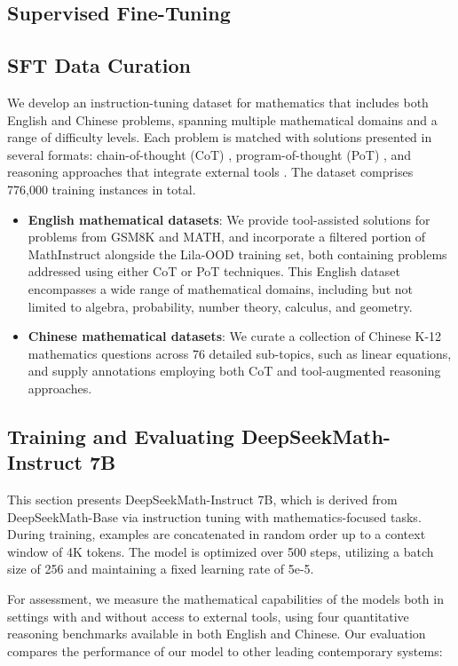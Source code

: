 \begin{itemize}[topsep=0pt]
\section{Supervised Fine-Tuning}

\subsection{SFT Data Curation}

We develop an instruction-tuning dataset for mathematics that includes both English and Chinese problems, spanning multiple mathematical domains and a range of difficulty levels. Each problem is matched with solutions presented in several formats: chain-of-thought (CoT) \citep{cot}, program-of-thought (PoT) \citep{pot,pal}, and reasoning approaches that integrate external tools \citep{tora}. The dataset comprises 776,000 training instances in total.

\begin{itemize}[topsep=0pt]
    \item \textbf{English mathematical datasets}: We provide tool-assisted solutions for problems from GSM8K and MATH, and incorporate a filtered portion of MathInstruct \citep{MathInstruct} alongside the Lila-OOD \citep{lila} training set, both containing problems addressed using either CoT or PoT techniques. This English dataset encompasses a wide range of mathematical domains, including but not limited to algebra, probability, number theory, calculus, and geometry.
    \item \textbf{Chinese mathematical datasets}: We curate a collection of Chinese K-12 mathematics questions across 76 detailed sub-topics, such as linear equations, and supply annotations employing both CoT and tool-augmented reasoning approaches.
\end{itemize}

\subsection{Training and Evaluating DeepSeekMath-Instruct 7B}

This section presents DeepSeekMath-Instruct 7B, which is derived from DeepSeekMath-Base via instruction tuning with mathematics-focused tasks. During training, examples are concatenated in random order up to a context window of 4K tokens. The model is optimized over 500 steps, utilizing a batch size of 256 and maintaining a fixed learning rate of 5e-5.

For assessment, we measure the mathematical capabilities of the models both in settings with and without access to external tools, using four quantitative reasoning benchmarks available in both English and Chinese. Our evaluation compares the performance of our model to other leading contemporary systems:


\end{itemize}
